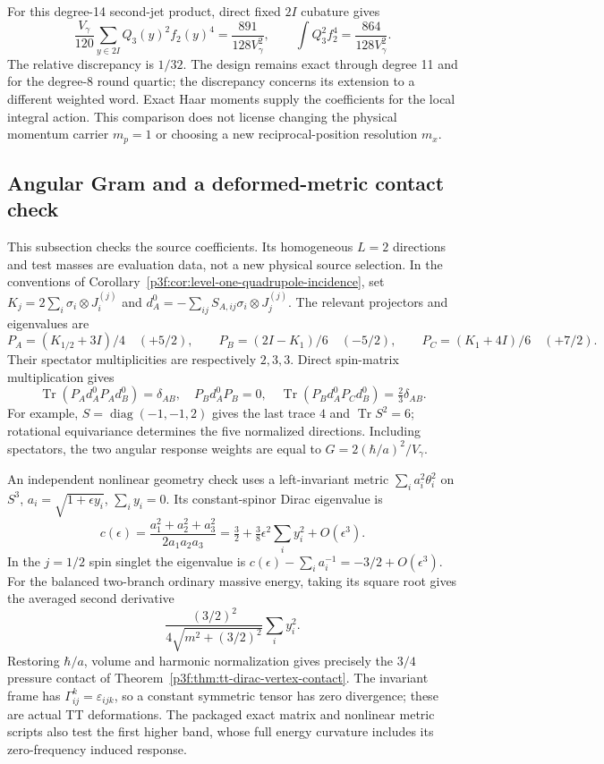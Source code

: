 \documentclass[11pt,a4paper]{article}
\begin{document}
For this degree-14 second-jet product, direct fixed $2I$ cubature gives
\[
 \frac{V_\gamma}{120}\sum_{y\in2I}Q_3(y)^2f_2(y)^4
 =\frac{891}{128V_\gamma^2},\qquad
 \int Q_3^2f_2^4=\frac{864}{128V_\gamma^2}.
\]
The relative discrepancy is $1/32$. The design remains exact through
degree 11 and for the degree-8 round quartic; the discrepancy concerns
its extension to a different weighted word. Exact Haar moments supply
the coefficients for the local integral action. This comparison does not
license changing the physical momentum carrier $m_p=1$ or choosing a
new reciprocal-position resolution $m_x$.




\subsection{Angular Gram and a deformed-metric contact check}
\label{p3f:app:tt-angular-contacts}
This subsection checks the source coefficients. Its homogeneous $L=2$
directions and test masses are evaluation data, not a new physical source
selection. In the conventions of
Corollary~\ref{p3f:cor:level-one-quadrupole-incidence}, set
$K_j=2\sum_i\sigma_i\otimes J_i^{(j)}$ and
$d_A^0=-\sum_{ij}S_{A,ij}\sigma_i\otimes J_j^{(j)}$.
The relevant projectors and eigenvalues are
\[
 P_A=(K_{1/2}+3I)/4\quad(+5/2),\qquad
 P_B=(2I-K_1)/6\quad(-5/2),\qquad
 P_C=(K_1+4I)/6\quad(+7/2).
\]
Their spectator multiplicities are respectively $2,3,3$.
Direct spin-matrix multiplication gives
\[
 \operatorname{Tr}(P_Ad_A^0P_Ad_B^0)=\delta_{AB},\quad
 P_Bd_A^0P_B=0,\quad
 \operatorname{Tr}(P_Bd_A^0P_Cd_B^0)=\tfrac23\delta_{AB}.
\]
For example, $S=\operatorname{diag}(-1,-1,2)$ gives the last trace $4$
and $\operatorname{Tr}S^2=6$; rotational equivariance determines the five
normalized directions. Including spectators, the two angular response
weights are equal to $G=2(\hbar/a)^2/V_\gamma$.

An independent nonlinear geometry check uses a left-invariant metric
$\sum_i a_i^2\theta_i^2$ on $S^3$, $a_i=\sqrt{1+\epsilon y_i}$,
$\sum_i y_i=0$. Its constant-spinor Dirac eigenvalue is
\[
 c(\epsilon)=\frac{a_1^2+a_2^2+a_3^2}{2a_1a_2a_3}
  =\tfrac32+\tfrac38\epsilon^2\sum_i y_i^2+O(\epsilon^3).
\]
In the $j=1/2$ spin singlet the eigenvalue is
$c(\epsilon)-\sum_i a_i^{-1}=-3/2+O(\epsilon^3)$.
For the balanced two-branch ordinary massive energy, taking its square
root gives the averaged second derivative
\[
 \frac{(3/2)^2}{4\sqrt{m^2+(3/2)^2}}\sum_i y_i^2.
\]
Restoring $\hbar/a$, volume and harmonic normalization gives precisely
the $3/4$ pressure contact of
Theorem~\ref{p3f:thm:tt-dirac-vertex-contact}. The invariant frame has
$\Gamma_{ij}^{k}=\varepsilon_{ijk}$, so a constant symmetric tensor has
zero divergence; these are actual TT deformations. The packaged exact
matrix and nonlinear metric scripts also test the first higher band,
whose full energy curvature includes its zero-frequency induced response.
\end{document}
